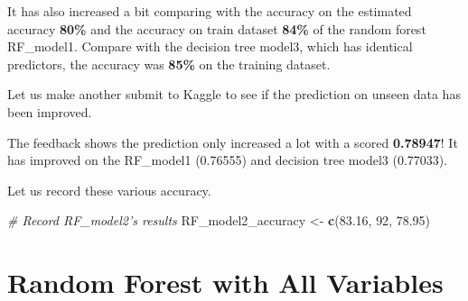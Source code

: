 \documentclass[
]{book}
\newenvironment{Shaded}{\begin{snugshade}}{\end{snugshade}}
\newcommand{\CommentTok}[1]{\textcolor[rgb]{0.56,0.35,0.01}{\textit{#1}}}
\newcommand{\DataTypeTok}[1]{\textcolor[rgb]{0.13,0.29,0.53}{#1}}
\newcommand{\DecValTok}[1]{\textcolor[rgb]{0.00,0.00,0.81}{#1}}
\newcommand{\FloatTok}[1]{\textcolor[rgb]{0.00,0.00,0.81}{#1}}
\newcommand{\KeywordTok}[1]{\textcolor[rgb]{0.13,0.29,0.53}{\textbf{#1}}}
\newcommand{\NormalTok}[1]{#1}
\newcommand{\OperatorTok}[1]{\textcolor[rgb]{0.81,0.36,0.00}{\textbf{#1}}}
\newcommand{\OtherTok}[1]{\textcolor[rgb]{0.56,0.35,0.01}{#1}}
\newcommand{\StringTok}[1]{\textcolor[rgb]{0.31,0.60,0.02}{#1}}
\begin{document}
It has also increased a bit comparing with the accuracy on the estimated accuracy \textbf{80\%} and the accuracy on train dataset \textbf{84\%} of the random forest RF\_model1. Compare with the decision tree model3, which has identical predictors, the accuracy was \textbf{85\%} on the training dataset.

Let us make another submit to Kaggle to see if the prediction on unseen data has been improved.

\begin{Shaded}
\end{Shaded}

The feedback shows the prediction only increased a lot with a scored \textbf{0.78947}! It has improved on the RF\_model1 (0.76555) and decision tree model3 (0.77033).

Let us record these various accuracy.

\begin{Shaded}
\begin{Highlighting}[]
\CommentTok{# Record RF_model2's results}
\NormalTok{RF_model2_accuracy <-}\StringTok{ }\KeywordTok{c}\NormalTok{(}\FloatTok{83.16}\NormalTok{, }\DecValTok{92}\NormalTok{, }\FloatTok{78.95}\NormalTok{)}
\end{Highlighting}
\end{Shaded}

\hypertarget{random-forest-with-all-variables}{%
\section{Random Forest with All Variables}\label{random-forest-with-all-variables}}
\end{document}
